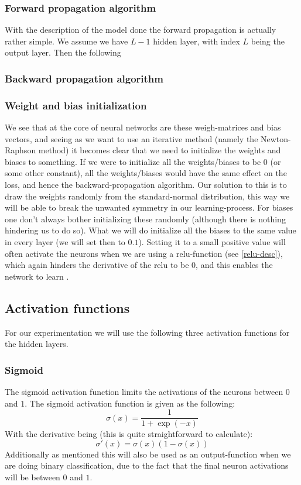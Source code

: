 \documentclass{article}
\begin{document}
\subsubsection{Forward propagation algorithm}
With the description of the model done the forward propagation is actually
rather simple. We assume we have $L-1$ hidden layer, with index $L$ being the output layer. Then the following

\subsubsection{Backward propagation algorithm}

\subsubsection{Weight and bias initialization}
We see that at the core of neural networks are these weigh-matrices and bias
vectors, and seeing as we want to use an iterative method (namely the
Newton-Raphson method) it becomes clear that we need to initialize the weights
and biases to something. If we were to initialize all the weights/biases to be
$0$ (or some other constant), all the weights/biases would have the same effect
on the loss, and hence the backward-propagation algorithm. Our solution to this
is to draw the weights randomly from the standard-normal distribution, this way
we will be able to break the unwanted symmetry in our learning-process. For
biases one don't always bother initializing these randomly (although there is
nothing hindering us to do so). What we will do initialize all the biases to the
same value in every layer (we will set then to $0.1$). Setting it to a small
positive value will often activate the neurons when we are using a
relu-function (see \ref{relu-desc}), which again hinders the derivative of the
relu to be $0$, and this enables the network to learn
\cite[s.~6.3.1]{goodfellow2016deep}.

\subsection{Activation functions}
For our experimentation we will use the following three activation functions for
the hidden layers.
\subsubsection{Sigmoid}
The sigmoid activation function limits the activations of the neurons between
$0$ and $1$. The sigmoid activation function is given as the following:
$$\sigma(x) = \frac{1}{1 + \exp(-x)}$$
With the derivative being (this is quite straightforward to calculate):
$$\sigma'(x) = \sigma(x) (1 - \sigma(x))$$
Additionally as mentioned this will also be used as an output-function when we
are doing binary classification, due to the fact that the final neuron
activations will be between $0$ and $1$.
\end{document}
